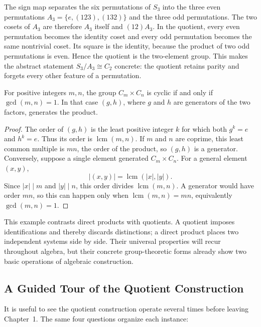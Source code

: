 \begin{example}
The sign map separates the six permutations of \(S_3\) into the three even
permutations \(A_3=\{e,(123),(132)\}\) and the three odd permutations. The
two cosets of \(A_3\) are therefore \(A_3\) itself and \((12)A_3\).  In the
quotient, every even permutation becomes the identity coset and every odd
permutation becomes the same nontrivial coset.  Its square is the identity,
because the product of two odd permutations is even.  Hence the quotient is
the two-element group.  This makes the abstract statement
\(S_3/A_3\cong C_2\) concrete: the quotient retains parity and forgets every
other feature of a permutation.
\end{example}

\begin{proposition}
For positive integers \(m,n\), the group \(C_m\times C_n\) is cyclic if and
only if \(\gcd(m,n)=1\).  In that case \((g,h)\), where \(g\) and \(h\) are
generators of the two factors, generates the product.
\end{proposition}
\begin{proof}
The order of \((g,h)\) is the least positive integer \(k\) for which both
\(g^k=e\) and \(h^k=e\).  Thus its order is \(\operatorname{lcm}(m,n)\).
If \(m\) and \(n\) are coprime, this least common multiple is \(mn\), the
order of the product, so \((g,h)\) is a generator.  Conversely, suppose a
single element generated \(C_m\times C_n\). For a general element \((x,y)\),
\[
|(x,y)|=\operatorname{lcm}(|x|,|y|).
\]
Since \(|x|\mid m\) and \(|y|\mid n\), this order divides
\(\operatorname{lcm}(m,n)\). A generator would have order \(mn\), so this
can happen only when \(\operatorname{lcm}(m,n)=mn\), equivalently
\(\gcd(m,n)=1\).
\end{proof}

This example contrasts direct products with quotients.  A quotient imposes
identifications and thereby discards distinctions; a direct product places two
independent systems side by side.  Their universal properties will recur
throughout algebra, but their concrete group-theoretic forms already show two
basic operations of algebraic construction.

\subsection*{A Guided Tour of the Quotient Construction}

It is useful to see the quotient construction operate several times before
leaving Chapter~1. The same four questions organize each instance:

